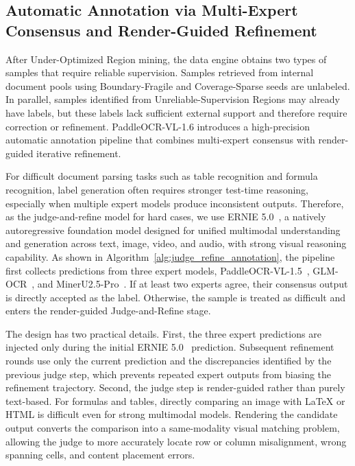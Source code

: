 \documentclass[11pt, a4paper,logo,  copyright, nonumbering]{paddleocr}
\begin{document}
\subsection{Automatic Annotation via Multi-Expert Consensus and Render-Guided Refinement}

After Under-Optimized Region mining, the data engine obtains two types of samples that require reliable supervision. Samples retrieved from internal document pools using Boundary-Fragile and Coverage-Sparse seeds are unlabeled. In parallel, samples identified from Unreliable-Supervision Regions may already have labels, but these labels lack sufficient external support and therefore require correction or refinement. PaddleOCR-VL-1.6 introduces a high-precision automatic annotation pipeline that combines multi-expert consensus with render-guided iterative refinement.

For difficult document parsing tasks such as table recognition and formula recognition, label generation often requires stronger test-time reasoning, especially when multiple expert models produce inconsistent outputs. Therefore, as the judge-and-refine model for hard cases, we use ERNIE 5.0~\cite{wang2026ernie}, a natively autoregressive foundation model designed for unified multimodal understanding and generation across text, image, video, and audio, with strong visual reasoning capability. As shown in Algorithm~\ref{alg:judge_refine_annotation}, the pipeline first collects predictions from three expert models, PaddleOCR-VL-1.5~\cite{cui2026paddleocrvl15multitask09bvlm}, GLM-OCR~\cite{duan2026glmocrtechnicalreport}, and MinerU2.5-Pro~\cite{MinerU25Pro}. If at least two experts agree, their consensus output is directly accepted as the label. Otherwise, the sample is treated as difficult and enters the render-guided Judge-and-Refine stage.

The design has two practical details. First, the three expert predictions are injected only during the initial ERNIE 5.0~\cite{wang2026ernie} prediction. Subsequent refinement rounds use only the current prediction and the discrepancies identified by the previous judge step, which prevents repeated expert outputs from biasing the refinement trajectory. Second, the judge step is render-guided rather than purely text-based. For formulas and tables, directly comparing an image with LaTeX or HTML is difficult even for strong multimodal models. Rendering the candidate output converts the comparison into a same-modality visual matching problem, allowing the judge to more accurately locate row or column misalignment, wrong spanning cells, and content placement errors.
\end{document}
